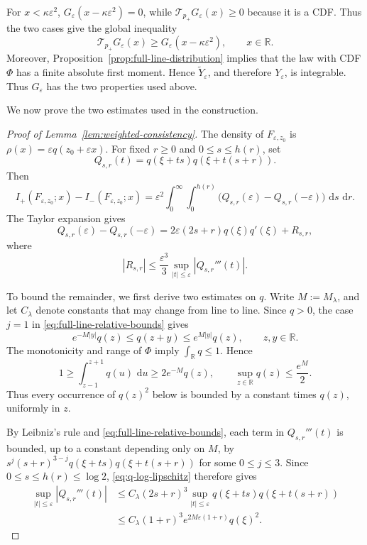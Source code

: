 \documentclass[12pt]{amsart}
\numberwithin{equation}{section}
\theoremstyle{plain}
\theoremstyle{definition}
\newcommand{\dd}{\,\mathrm d}
\begin{document}
For $x<\kappa\varepsilon^2$,
$G_\varepsilon(x-\kappa\varepsilon^2)=0$, while
$\mathcal T_{p_+}G_\varepsilon(x)\ge0$ because it is a CDF.  Thus the two
cases give the global inequality
\begin{equation*}
 \mathcal T_{p_+}G_\varepsilon(x)
 \ge G_\varepsilon(x-\kappa\varepsilon^2),
 \qquad x\in\mathbb R.
\end{equation*}
Moreover, Proposition~\ref{prop:full-line-distribution} implies that the law
with CDF $\Phi$ has a finite absolute first moment.  Hence $\widetilde Y_\varepsilon$, and therefore
$Y_\varepsilon$, is integrable.  Thus $G_\varepsilon$ has the two properties
used above.


We now prove the two estimates used in the construction.

\begin{proof}[Proof of Lemma~\ref{lem:weighted-consistency}]


The density of $F_{\varepsilon,z_0}$ is
$\rho(x)=\varepsilon q(z_0+\varepsilon x)$.
For fixed $r\ge0$ and
$0\le s\le h(r)$, set
\[
 Q_{s,r}(t)=q(\xi+ts)q(\xi+t(s+r)).
\]
Then
\[
 I_+(F_{\varepsilon,z_0};x)-I_-(F_{\varepsilon,z_0};x)
 =\varepsilon^2\int_0^\infty\int_0^{h(r)}
 \bigl(Q_{s,r}(\varepsilon)-Q_{s,r}(-\varepsilon)\bigr)
 \,\dd s\,\dd r.
\]
The Taylor expansion gives
\[
 Q_{s,r}(\varepsilon)-Q_{s,r}(-\varepsilon)
 =2\varepsilon(2s+r)q(\xi)q'(\xi)+R_{s,r},
\]
where
\[
 |R_{s,r}|\le\frac{\varepsilon^3}{3}
 \sup_{|t|\le\varepsilon}|Q_{s,r}'''(t)|.
\]

To bound the remainder, we first derive two estimates on $q$. Write $M:=M_\lambda$, and let $C_\lambda$ denote constants that may change from line to line. Since $q>0$, the case $j=1$ in
\eqref{eq:full-line-relative-bounds} gives
\begin{equation}
 e^{-M|y|}q(z)\le q(z+y)\le e^{M|y|}q(z),
 \qquad z,y\in\mathbb R.
 \label{eq:q-log-lipschitz}
\end{equation}
The monotonicity and range of $\Phi$ imply
$\int_{\mathbb R}q\le1$.  Hence
\begin{equation}
 1\ge\int_{z-1}^{z+1}q(u)\,\dd u
 \ge 2e^{-M}q(z),
 \qquad
 \sup_{z\in\mathbb R}q(z)\le\frac{e^M}{2}.
 \label{eq:q-uniform-bound}
\end{equation}
Thus every occurrence of $q(z)^2$ below is bounded by a constant times
$q(z)$, uniformly in $z$.

By Leibniz's rule and
\eqref{eq:full-line-relative-bounds}, each term in
$Q_{s,r}'''(t)$ is bounded, up to a constant depending only on $M$, by
$s^j(s+r)^{3-j}q(\xi+ts)q(\xi+t(s+r))$ for some $0\le j\le3$.
Since $0\le s\le h(r)\le\log2$,
\eqref{eq:q-log-lipschitz} therefore gives
\[
\begin{aligned}
 \sup_{|t|\le\varepsilon}|Q_{s,r}'''(t)|
 &\le C_\lambda(2s+r)^3
   \sup_{|t|\le\varepsilon}
   q(\xi+ts)q(\xi+t(s+r))\\
 &\le C_\lambda(1+r)^3e^{2M\varepsilon(1+r)}q(\xi)^2.
\end{aligned}
\]



\end{proof}
\end{document}
